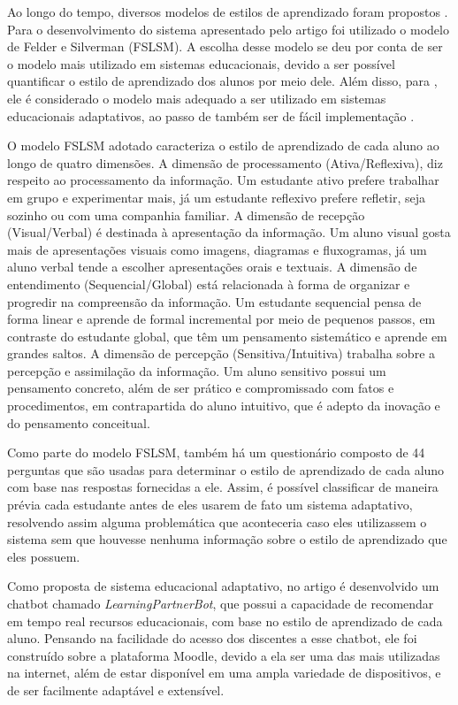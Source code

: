 Ao longo do tempo, diversos modelos de estilos de aprendizado foram propostos . Para o desenvolvimento do sistema apresentado pelo artigo foi utilizado o modelo de Felder e Silverman (FSLSM). A escolha desse modelo se deu por conta de ser o modelo mais utilizado em sistemas educacionais, devido a ser possível quantificar o estilo de aprendizado dos alunos por meio dele. Além disso, para , ele é considerado o modelo mais adequado a ser utilizado em sistemas educacionais adaptativos, ao passo de também ser de fácil implementação .

O modelo FSLSM adotado caracteriza o estilo de aprendizado de cada aluno ao longo de quatro dimensões. A dimensão de processamento (Ativa/Reflexiva), diz respeito ao processamento da informação. Um estudante ativo prefere trabalhar em grupo e experimentar mais, já um estudante reflexivo prefere refletir, seja sozinho ou com uma companhia familiar. A dimensão de recepção (Visual/Verbal) é destinada à apresentação da informação. Um aluno visual gosta mais de apresentações visuais como imagens, diagramas e fluxogramas, já um aluno verbal tende a escolher apresentações orais e textuais. A dimensão de entendimento (Sequencial/Global) está relacionada à forma de organizar e progredir na compreensão da informação. Um estudante sequencial pensa de forma linear e aprende de formal incremental por meio de pequenos passos, em contraste do estudante global, que têm um pensamento sistemático e aprende em grandes saltos. A dimensão de percepção (Sensitiva/Intuitiva) trabalha sobre a percepção e assimilação da informação. Um aluno sensitivo possui um pensamento concreto, além de ser prático e compromissado com fatos e procedimentos, em contrapartida do aluno intuitivo, que é adepto da inovação e do pensamento conceitual.

Como parte do modelo FSLSM, também há um questionário composto de 44 perguntas que são usadas para determinar o estilo de aprendizado de cada aluno com base nas respostas fornecidas a ele. Assim, é possível classificar de maneira prévia cada estudante antes de eles usarem de fato um sistema adaptativo, resolvendo assim alguma problemática que aconteceria caso eles utilizassem o sistema sem que houvesse nenhuma informação sobre o estilo de aprendizado que eles possuem.

Como proposta de sistema educacional adaptativo, no artigo é desenvolvido um chatbot chamado \textit{LearningPartnerBot}, que possui a capacidade de recomendar em tempo real recursos educacionais, com base no estilo de aprendizado de cada aluno. Pensando na facilidade do acesso dos discentes a esse chatbot, ele foi construído sobre a plataforma Moodle, devido a ela ser uma das mais utilizadas na internet, além de estar disponível em uma ampla variedade de dispositivos, e de ser facilmente adaptável e extensível.

